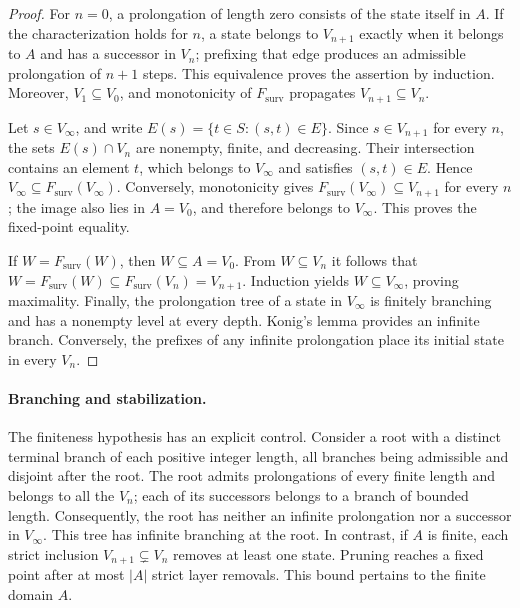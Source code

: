 \begin{proof}
For \(n=0\), a prolongation of length zero consists of the state
itself in \(A\). If the characterization holds for \(n\), a state
belongs to \(V_{n+1}\) exactly when it belongs to \(A\) and has a
successor in \(V_n\); prefixing that edge produces an admissible
prolongation of \(n+1\) steps. This equivalence proves the assertion by
induction. Moreover, \(V_1\subseteq V_0\), and monotonicity of
\(F_{\mathrm{surv}}\) propagates \(V_{n+1}\subseteq V_n\).

Let \(s\in V_\infty\), and write
\(E(s)=\{t\in S:(s,t)\in E\}\). Since \(s\in V_{n+1}\) for every \(n\),
the sets \(E(s)\cap V_n\) are nonempty, finite, and decreasing.
Their intersection contains an element \(t\), which belongs to
\(V_\infty\) and satisfies \((s,t)\in E\). Hence
\(V_\infty\subseteq F_{\mathrm{surv}}(V_\infty)\).
Conversely, monotonicity gives
\(F_{\mathrm{surv}}(V_\infty)\subseteq V_{n+1}\) for every \(n\);
the image also lies in \(A=V_0\), and therefore belongs to
\(V_\infty\). This proves the fixed-point equality.

If \(W=F_{\mathrm{surv}}(W)\), then \(W\subseteq A=V_0\).
From \(W\subseteq V_n\) it follows that
\(W=F_{\mathrm{surv}}(W)\subseteq F_{\mathrm{surv}}(V_n)=V_{n+1}\).
Induction yields \(W\subseteq V_\infty\), proving maximality.
Finally, the prolongation tree of a state in \(V_\infty\) is finitely
branching and has a nonempty level at every depth. Konig's lemma
provides an infinite branch. Conversely, the prefixes of any infinite
prolongation place its initial state in every \(V_n\).
\end{proof}

\paragraph{Branching and stabilization.}
The finiteness hypothesis has an explicit control. Consider a root
with a distinct terminal branch of each positive integer length, all
branches being admissible and disjoint after the root. The root
admits prolongations of every finite length and belongs to all the
\(V_n\); each of its successors belongs to a branch of bounded length.
Consequently, the root has neither an infinite prolongation nor a
successor in \(V_\infty\). This tree has infinite branching at the
root. In contrast, if \(A\) is finite, each strict inclusion
\(V_{n+1}\subsetneq V_n\) removes at least one state. Pruning reaches
a fixed point after at most \(|A|\) strict layer removals.
This bound pertains to the finite domain \(A\).

